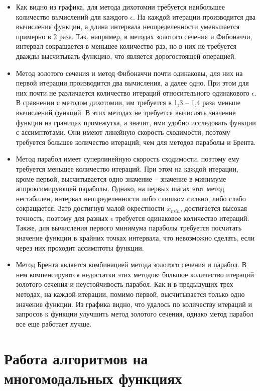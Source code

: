 \documentclass[12pt]{article}
\begin{document}
\begin{itemize}
\item Как видно из графика, для метода дихотомии требуется наибольшее количество вычислений для каждого $\epsilon$. На каждой итерации производится два вычисления функции, а длина интервала неопределенности уменьшается примерно в 2 раза. Так, например, в методах золотого сечения и Фибоначчи, интервал сокращается в меньшее количество раз, но в них не требуется дважды высчитывать функцию, что является дорогостоящей операцией.

\item Метод золотого сечения и метод Фибоначчи почти одинаковы, для них на первой итерации производится два вычисления, а далее одно. При этом для них почти не различается количество итераций относительного одинакового $\epsilon$. В сравнении с методом дихотомии, им требуется в 1,3 -- 1,4 раза меньше вычислений функций. В этих методах не требуется вычислять значение функции на границах промежутка, а значит, ими удобно исследовать функции с ассимптотами. Они имеют линейную скорость сходимости, поэтому требуется большее количество итераций, чем для методов параболы и Брента.

\item Метод парабол имеет суперлинейную скорость сходимости, поэтому ему требуется меньшее количество итераций. При этом на каждой итерации, кроме первой, высчитывается одно значение -- значение в минимуме аппроксимирующей параболы. Однако, на первых шагах этот метод нестабилен, интервал неопределенности либо слишком сильно, либо слабо сокращается. Зато достигнув малой окрестности $x_{min}$, достигается высокая точность, поэтому для разных $\epsilon$ требуется одинаковое количество итераций. Также, для вычисления первого минимума параболы требуется посчитать значение функции в крайних точках интервала, что невозможно сделать, если через них проходит ассимптоты функции.

\item Метод Брента является комбинацией метода золотого сечения и парабол. В нем компенсируются недостатки этих методов: большое количество итераций золотого сечения и неустойчивость парабол. Как и в предыдущих трех методах, на каждой итерации, помимо первой, высчитывается только одно значение функции. Из графика видно, что удалось по количеству итераций и запросов к функции улучшить метод золотого сечения, однако метод парабол все еще работает лучше. 
\end{itemize}

\newpage
\section{Работа алгоритмов на многомодальных функциях}
\end{document}
